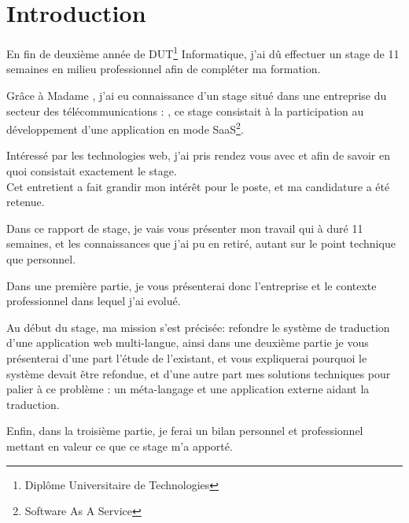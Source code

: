 \tableofcontents
\chapter*{Introduction}
En fin de deuxième année de DUT\footnote{Diplôme Universitaire de Technologies} Informatique, j'ai dû effectuer un stage de 11 semaines
en milieu professionnel afin de compléter ma formation.

Grâce à Madame , j'ai eu connaissance d'un stage situé dans une entreprise du secteur des télécommunications : \mbx{}, ce stage
consistait à la participation au développement d'une application en mode SaaS\footnote{Software As A Service}.

Intéressé par les technologies web, j'ai pris rendez vous avec \Denis{} et \Romain{} afin de savoir en quoi consistait exactement le stage. \\
Cet entretient a fait grandir mon intérêt pour le poste, et ma candidature a été retenue.

Dans ce rapport de stage, je vais vous présenter mon travail qui à duré 11 semaines, et les connaissances que j'ai pu en retiré, autant sur le point technique que personnel.

Dans une première partie, je vous présenterai donc l'entreprise et le contexte professionnel dans lequel j'ai evolué.

Au début du stage, ma mission s'est précisée: refondre le système de traduction d'une application web multi-langue, ainsi dans une deuxième partie je vous présenterai
d'une part l'étude de l'existant, et vous expliquerai pourquoi le système devait être refondue, et d'une autre part mes solutions techniques pour palier à ce problème : un méta-langage et une application externe aidant la traduction.

Enfin, dans la troisième partie, je ferai un bilan personnel et professionnel mettant en valeur ce que ce stage m'a apporté.
